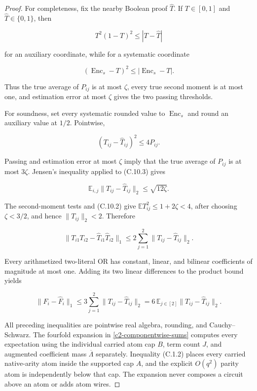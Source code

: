 \documentclass[11pt,letterpaper]{article}
\newcommand{\cref}[1]{\ref{#1}}
\theoremstyle{definition}
\theoremstyle{remark}
\begin{document}
\begin{proof} For completeness, fix the nearby Boolean proof
\(\widehat T\). If \(T\in[0,1]\) and \(\widehat T\in\{0,1\}\), then

\[
T^2(1-T)^2
\le
|T-\widehat T|
\]

for an auxiliary coordinate, while for a systematic coordinate

\[
(\operatorname{Enc}_s-T)^2
\le
|\operatorname{Enc}_s-T|.
\]

Thus the true average of \(P_{ij}\) is at most \(\zeta\), every true
second moment is at most one, and estimation error at most \(\zeta\)
gives the two passing thresholds.

For soundness, set every systematic rounded value to
\(\operatorname{Enc}_s\) and round an auxiliary value at \(1/2\).
Pointwise,

\[
(T_{ij}-\widehat T_{ij})^2
\le
4P_{ij}.
\tag{C.10.3}
\]

Passing and estimation error at most \(\zeta\) imply that the true
average of \(P_{ij}\) is at most \(3\zeta\). Jensen's
inequality applied to (C.10.3) gives

\[
\mathbb E_{i,j}
\lVert T_{ij}-\widehat T_{ij}\rVert_2
\le
\sqrt{12\zeta}.
\]

The second-moment tests and (C.10.2) give
\(\mathbb E T_{ij}^2\le1+2\zeta<4\), after choosing \(\zeta<3/2\), and
hence \(\lVert T_{ij}\rVert_2<2\). Therefore

\[
\lVert T_{i1}T_{i2}
{}-{}
\widehat T_{i1}\widehat T_{i2}
\rVert_1
\le
2
\sum_{j=1}^2
\lVert T_{ij}-\widehat T_{ij}\rVert_2.
\]

Every arithmetized two-literal OR has constant, linear, and bilinear
coefficients of magnitude at most one. Adding its two linear differences
to the product bound yields

\[
\lVert F_i-\widehat F_i\rVert_1
\le
3\sum_{j=1}^2
\lVert T_{ij}-\widehat T_{ij}\rVert_2
{}={}
6\,
\mathbb E_{j\in[2]}
\lVert T_{ij}-\widehat T_{ij}\rVert_2.
\]

All preceding inequalities are pointwise real algebra, rounding, and
Cauchy--Schwarz. The fourfold expansion in \cref{c2-componentwise-sums} computes every
expectation using the individual carried atom cap \(B\), term count
\(J\), and augmented coefficient mass \(\overline\Lambda\) separately.
Inequality (C.1.2) places every carried native-arity atom inside the
supported cap \(A\), and the explicit \(O(q^2)\) parity atom is
independently below that cap. The expansion never composes a circuit
above an atom or adds atom wires. \end{proof}
\end{document}
